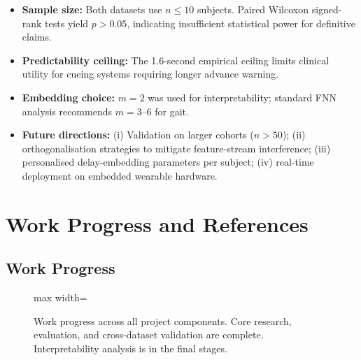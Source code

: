 \documentclass[12pt,a4paper]{article}
\begin{document}
\begin{itemize}[leftmargin=*, itemsep=4pt]
  \item \textbf{Sample size:} Both datasets use $n \leq 10$ subjects. Paired Wilcoxon
        signed-rank tests yield $p > 0.05$, indicating insufficient statistical power for
        definitive claims.
  \item \textbf{Predictability ceiling:} The 1.6-second empirical ceiling limits clinical
        utility for cueing systems requiring longer advance warning.
  \item \textbf{Embedding choice:} $m=2$ was used for interpretability; standard FNN analysis
        recommends $m=3$--6 for gait.
  \item \textbf{Future directions:} (i) Validation on larger cohorts ($n > 50$);
        (ii) orthogonalisation strategies to mitigate feature-stream interference;
        (iii) personalised delay-embedding parameters per subject;
        (iv) real-time deployment on embedded wearable hardware.
\end{itemize}

\newpage
\section*{Work Progress and References}

\subsection*{Work Progress}

\begin{figure}[ht]
\centering
\begin{adjustbox}{max width=\textwidth}
\end{adjustbox}
\caption{Work progress across all project components. Core research, evaluation, and
cross-dataset validation are complete. Interpretability analysis is in the final stages.}
\label{fig:progress}
\end{figure}
\end{document}
